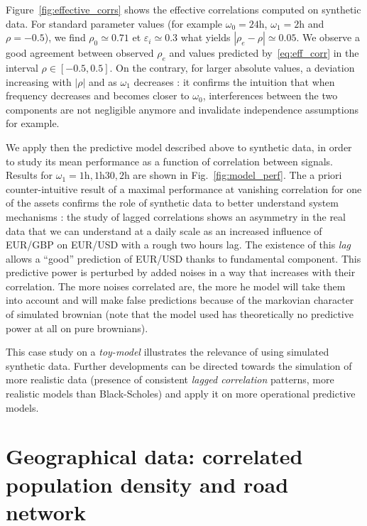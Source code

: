 \documentclass{article}
\begin{document}
Figure~\ref{fig:effective_corrs} shows the effective correlations computed on synthetic data. For standard parameter values (for example $\omega_0=24\textrm{h}$, $\omega_1=2\textrm{h}$ and $\rho=-0.5$), we find $\rho_0\simeq 0.71$ et $\varepsilon_i \simeq 0.3$ what yields $\left| \rho_e - \rho \right|\simeq 0.05$. We observe a good agreement between observed $\rho_e$ and values predicted by~\ref{eq:eff_corr} in the interval $\rho \in [-0.5,0.5]$. On the contrary, for larger absolute values, a deviation increasing with $\left|\rho\right|$ and as $\omega_1$ decreases : it confirms the intuition that when frequency decreases and becomes closer to $\omega_0$, interferences between the two components are not negligible anymore and invalidate independence assumptions for example.



We apply then the predictive model described above to synthetic data, in order to study its mean performance as a function of correlation between signals. Results for $\omega_1 = 1\textrm{h},1\textrm{h}30,2\textrm{h}$ are shown in Fig.~\ref{fig:model_perf}. The a priori counter-intuitive result of a maximal performance at vanishing correlation for one of the assets confirms the role of synthetic data to better understand system mechanisms : the study of lagged correlations shows an asymmetry in the real data that we can understand at a daily scale as an increased influence of EUR/GBP on EUR/USD with a rough two hours lag. The existence of this \emph{lag} allows a ``good'' prediction of EUR/USD thanks to fundamental component. This predictive power is perturbed by added noises in a way that increases with their correlation. The more noises correlated are, the more he model will take them into account and will make false predictions because of the markovian character of simulated brownian (note that the model used has theoretically no predictive power at all on pure brownians).


This case study on a \emph{toy-model} illustrates the relevance of using simulated synthetic data. Further developments can be directed towards the simulation of more realistic data (presence of consistent \emph{lagged correlation} patterns, more realistic models than Black-Scholes) and apply it on more operational predictive models.





\section*{Geographical data: correlated population density and road network}
\end{document}
